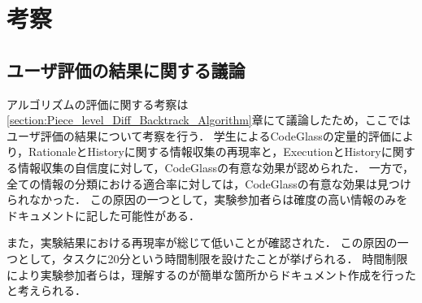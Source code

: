 \section{考察}
\subsection{ユーザ評価の結果に関する議論}

アルゴリズムの評価に関する考察は\ref{section:Piece_level_Diff_Backtrack_Algorithm}章にて議論したため，ここではユーザ評価の結果について考察を行う．
学生によるCodeGlassの定量的評価により，RationaleとHistoryに関する情報収集の再現率と，ExecutionとHistoryに関する情報収集の自信度に対して，CodeGlassの有意な効果が認められた．
一方で，全ての情報の分類における適合率に対しては，CodeGlassの有意な効果は見つけられなかった．
この原因の一つとして，実験参加者らは確度の高い情報のみをドキュメントに記した可能性がある．


また，実験結果における再現率が総じて低いことが確認された．
この原因の一つとして，タスクに20分という時間制限を設けたことが挙げられる．
時間制限により実験参加者らは，理解するのが簡単な箇所からドキュメント作成を行ったと考えられる．










